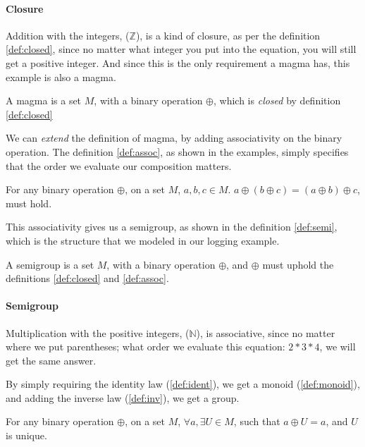 \paragraph{Closure} Addition with the integers, ($\mathbb{Z}$), is a kind of
  closure, as per the definition \ref{def:closed}, since no matter what integer
  you put into the equation, you will still get a positive integer. And since
  this is the only requirement a magma has, this example is also a magma.

\begin{definition}[Magma] \label{def:magma}
  A magma is a set $M$, with a binary operation $\oplus$, which is
  \textit{closed} by definition \ref{def:closed}
\end{definition}

We can \textit{extend} the definition of magma, by adding associativity on the
binary operation. The definition \ref{def:assoc}, as shown in the examples,
simply specifies that the order we evaluate our composition matters.

\begin{definition} \label{def:assoc}
  For any binary operation $\oplus$, on a set $M$, $a, b, c \in M$.
  $a \oplus \left ( b \oplus c \right ) = \left ( a \oplus b \right ) \oplus c$,
  must hold.
\end{definition}

This associativity gives us a semigroup, as shown in the definition
\ref{def:semi}, which is the structure that we modeled in our logging example.

\begin{definition}[Semigroup] \label{def:semi}
  A semigroup is a set $M$, with a binary operation $\oplus$, and $\oplus$ must
  uphold the definitions \ref{def:closed} and \ref{def:assoc}.
\end{definition}

\paragraph{Semigroup} Multiplication with the positive integers, ($\mathbb{N}$), is
  associative, since no matter where we put parentheses; what order we
  evaluate this equation: $2 * 3 * 4$, we will get the same answer.

By simply requiring the identity law (\ref{def:ident}), we get a
monoid (\ref{def:monoid}), and adding the inverse law
(\ref{def:inv}), we get a group.

\begin{definition} \label{def:ident}
  For any binary operation $\oplus$, on a set $M$,
  $\forall a, \exists U \in M$, such that
  $a \oplus U = a$, and $U$ is unique.
\end{definition}

